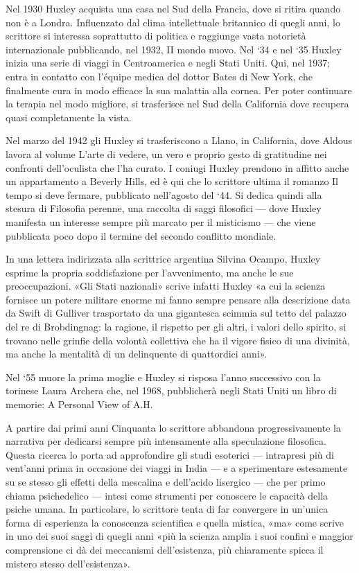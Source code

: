 \documentclass[
a5paper, %
10pt, %
twoside, 
onecolumn, %
openany, %
]{memoir}
\begin{document}
Nel 1930 Huxley acquista una casa nel Sud della Francia, dove si ritira quando non è a Londra. Influenzato dal clima intellettuale britannico di quegli anni, lo scrittore si interessa soprattutto di politica e raggiunge vasta notorietà internazionale pubblicando, nel 1932, II mondo nuovo. Nel ‘34 e nel ‘35 Huxley inizia una serie di viaggi in Centroamerica e negli Stati Uniti. Qui, nel 1937; entra in contatto con l’équipe medica del dottor Bates di New York, che finalmente cura in modo efficace la sua malattia alla cornea. Per poter continuare la terapia nel modo migliore, si trasferisce nel Sud della California dove recupera quasi completamente la vista.

Nel marzo del 1942 gli Huxley si trasferiscono a Llano, in California, dove Aldous lavora al volume L’arte di vedere, un vero e proprio gesto di gratitudine nei confronti dell’oculista che l’ha curato. I coniugi Huxley prendono in affitto anche un appartamento a Beverly Hills, ed è qui che lo scrittore ultima il romanzo Il tempo si deve fermare, pubblicato nell’agosto del ‘44. Si dedica quindi alla stesura di Filosofia perenne, una raccolta di saggi filosofici — dove Huxley manifesta un interesse sempre più marcato per il misticismo — che viene pubblicata poco dopo il termine del secondo conflitto mondiale.

In una lettera indirizzata alla scrittrice argentina Silvina Ocampo, Huxley esprime la propria soddisfazione per l’avvenimento, ma anche le sue preoccupazioni. «Gli Stati nazionali» scrive infatti Huxley «a cui la scienza fornisce un potere militare enorme mi fanno sempre pensare alla descrizione data da Swift di Gulliver trasportato da una gigantesca scimmia sul tetto del palazzo del re di Brobdingnag: la ragione, il rispetto per gli altri, i valori dello spirito, si trovano nelle grinfie della volontà collettiva che ha il vigore fisico di una divinità, ma anche la mentalità di un delinquente di quattordici anni».

Nel ‘55 muore la prima moglie e Huxley si risposa l’anno successivo con la torinese Laura Archera che, nel 1968, pubblicherà negli Stati Uniti un libro di memorie: A Personal View of A.H.

A partire dai primi anni Cinquanta lo scrittore abbandona progressivamente la narrativa per dedicarsi sempre più intensamente alla speculazione filosofica. Questa ricerca lo porta ad approfondire gli studi esoterici — intrapresi più di vent’anni prima in occasione dei viaggi in India — e a sperimentare estesamente su se stesso gli effetti della mescalina e dell’acido lisergico — che per primo chiama psichedelico — intesi come strumenti per conoscere le capacità della psiche umana. In particolare, lo scrittore tenta di far convergere in un’unica forma di esperienza la conoscenza scientifica e quella mistica, «ma» come scrive in uno dei suoi saggi di quegli anni «più la scienza amplia i suoi confini e maggior comprensione ci dà dei meccanismi dell’esistenza, più chiaramente spicca il mistero stesso dell’esistenza».
\end{document}
